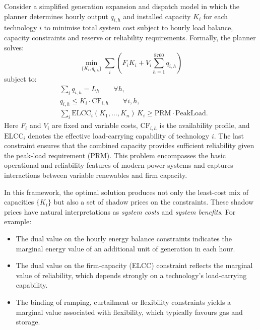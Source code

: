 \documentclass[preprint,authoryear,12pt]{elsarticle}
\begin{document}
Consider a simplified generation expansion and dispatch model in which the planner determines
hourly output $q_{i,h}$ and installed capacity $K_i$ for each technology $i$ to minimise total
system cost subject to hourly load balance, capacity constraints and reserve or reliability
requirements. Formally, the planner solves:
\begin{equation}
    \min_{\{K_i, q_{i,h}\}}
       \sum_i \left( F_i K_i + V_i \sum_{h=1}^{8760} q_{i,h} \right)
\end{equation}
subject to:
\begin{align}
    &\sum_i q_{i,h} = L_h \qquad \forall h, \\
    &q_{i,h} \le K_i \cdot \text{CF}_{i,h} \qquad \forall i,h, \\
    &\sum_i \text{ELCC}_i(K_1,\dots,K_n)\, K_i \ge \text{PRM} \cdot \text{PeakLoad}.
\end{align}
Here $F_i$ and $V_i$ are fixed and variable costs, $\text{CF}_{i,h}$ is the availability profile, and
$\text{ELCC}_i$ denotes the effective load-carrying capability of technology $i$. The last
constraint ensures that the combined capacity provides sufficient reliability given the peak-load
requirement (PRM). This problem encompasses the basic operational and reliability features of
modern power systems and captures interactions between variable renewables and firm
capacity.

In this framework, the optimal solution produces not only the least-cost mix of capacities
$\{K_i\}$ but also a set of shadow prices on the constraints. These shadow prices have natural
interpretations as \emph{system costs} and \emph{system benefits}. For example:
\begin{itemize}
    \item The dual value on the hourly energy balance constraints indicates the marginal energy
          value of an additional unit of generation in each hour.
    \item The dual value on the firm-capacity (ELCC) constraint reflects the marginal value of
          reliability, which depends strongly on a technology's load-carrying capability.
    \item The binding of ramping, curtailment or flexibility constraints yields a marginal value
          associated with flexibility, which typically favours gas and storage.
\end{itemize}
\end{document}
